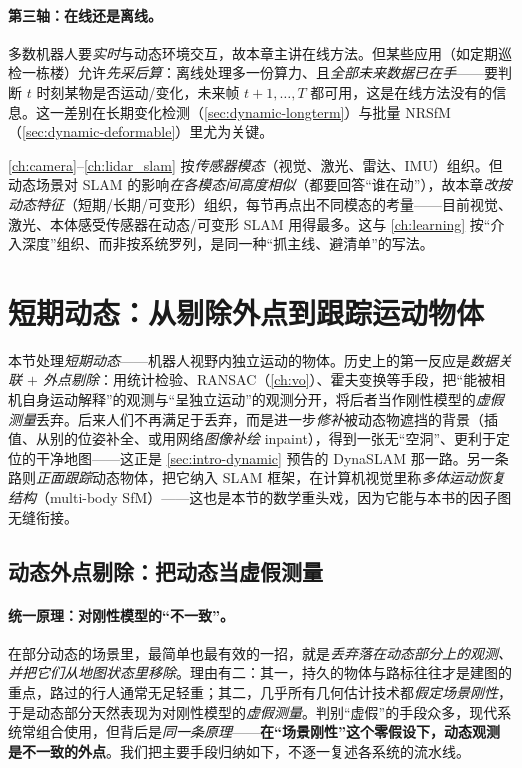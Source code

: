 \paragraph{第三轴：在线还是离线。}
多数机器人要\emph{实时}与动态环境交互，故本章主讲在线方法。但某些应用（如定期巡检一栋楼）允许\emph{先采后算}：离线处理多一份算力、且\emph{全部未来数据已在手}——要判断 $t$ 时刻某物是否运动/变化，未来帧 $t+1,\dots,T$ 都可用，这是在线方法没有的信息。这一差别在长期变化检测（\cref{sec:dynamic-longterm}）与批量 NRSfM（\cref{sec:dynamic-deformable}）里尤为关键。

\begin{insight}
\cref{ch:camera}--\cref{ch:lidar_slam} 按\emph{传感器模态}（视觉、激光、雷达、IMU）组织。但动态场景对 SLAM 的影响\emph{在各模态间高度相似}（都要回答“谁在动”），故本章\emph{改按动态特征}（短期/长期/可变形）组织，每节再点出不同模态的考量——目前视觉、激光、本体感受传感器在动态/可变形 SLAM 用得最多。这与 \cref{ch:learning} 按“介入深度”组织、而非按系统罗列，是同一种“抓主线、避清单”的写法。
\end{insight}

\section{短期动态：从剔除外点到跟踪运动物体}
\label{sec:dynamic-object}

本节处理\emph{短期动态}——机器人视野内独立运动的物体。历史上的第一反应是\emph{数据关联 $+$ 外点剔除}：用统计检验、RANSAC（\cref{ch:vo}）、霍夫变换等手段，把“能被相机自身运动解释”的观测与“呈独立运动”的观测分开，将后者当作刚性模型的\emph{虚假测量}丢弃\cite{schmid2026dynamic}。后来人们不再满足于丢弃，而是进一步\emph{修补}被动态物遮挡的背景（插值、从别的位姿补全、或用网络\emph{图像补绘} inpaint），得到一张无“空洞”、更利于定位的干净地图——这正是 \cref{sec:intro-dynamic} 预告的 DynaSLAM\cite{bescos2018dynaslam} 那一路。另一条路则\emph{正面跟踪}动态物体，把它纳入 SLAM 框架，在计算机视觉里称\emph{多体运动恢复结构}（multi-body SfM）——这也是本节的数学重头戏，因为它能与本书的因子图无缝衔接。

\subsection{动态外点剔除：把动态当虚假测量}
\label{sec:dynamic-removal}

\paragraph{统一原理：对刚性模型的“不一致”。}
在部分动态的场景里，最简单也最有效的一招，就是\emph{丢弃落在动态部分上的观测、并把它们从地图状态里移除}\cite{schmid2026dynamic}。理由有二：其一，持久的物体与路标往往才是建图的重点，路过的行人通常无足轻重；其二，几乎所有几何估计技术都\emph{假定场景刚性}，于是动态部分天然表现为对刚性模型的\emph{虚假测量}。判别“虚假”的手段众多，现代系统常组合使用，但背后是\emph{同一条原理}——\textbf{在“场景刚性”这个零假设下，动态观测是不一致的外点}。我们把主要手段归纳如下，不逐一复述各系统的流水线。

